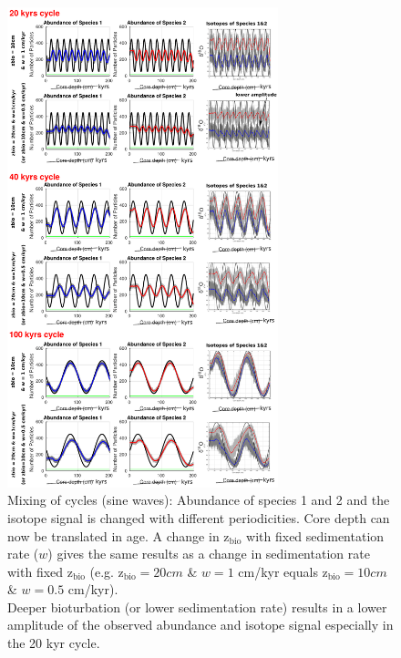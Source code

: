 \documentclass[a4paper,oneside,9pt]{article}
\begin{document}
\begin{figure}[hbp]
\begin{center}
	\includegraphics[width=0.7\textwidth]{../figures/../figures/20+40+100kyrcycle_10+20cm_background.pdf}
	\caption{Mixing of cycles (sine waves): Abundance of species 1 and 2 and the isotope signal is changed with different periodicities. Core depth can now be translated in age. A change in z$_\mathrm{bio}$ with fixed sedimentation rate ($w$) 
	gives the same results as a change in sedimentation rate with fixed z$_\mathrm{bio}$ (e.g. z$_\mathrm{bio}=20cm$ \& $w=1$ cm/kyr equals z$_\mathrm{bio}=10cm$ \& $w=0.5$ cm/kyr).\\
	Deeper bioturbation (or lower sedimentation rate) results in a lower amplitude of the observed abundance and isotope signal especially in the 20 kyr cycle. 
	}\label{fig:sine-waves}
\end{center}
\end{figure}
\end{document}
